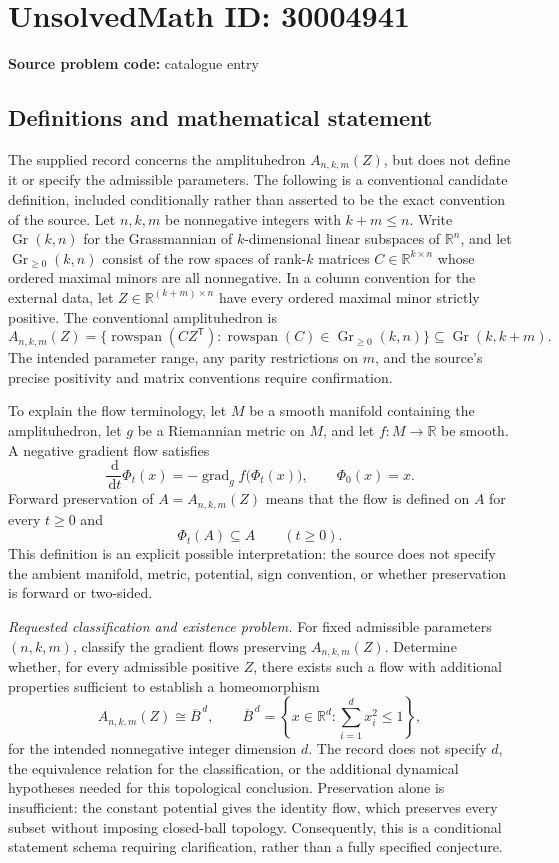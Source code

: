\documentclass[11pt]{article}
\newcommand{\R}{\mathbb{R}}
\newcommand{\dd}{\,\mathrm{d}}
\begin{document}
\section*{UnsolvedMath ID: 30004941}
\textbf{Source problem code:} catalogue entry
\subsection{Definitions and mathematical statement}
The supplied record concerns the amplituhedron \(A_{n,k,m}(Z)\), but does not define it or specify the admissible parameters. The following is a conventional candidate definition, included conditionally rather than asserted to be the exact convention of the source. Let \(n,k,m\) be nonnegative integers with \(k+m\leq n\). Write \(\operatorname{Gr}(k,n)\) for the Grassmannian of \(k\)-dimensional linear subspaces of \(\R^n\), and let \(\operatorname{Gr}_{\geq0}(k,n)\) consist of the row spaces of rank-\(k\) matrices \(C\in\R^{k\times n}\) whose ordered maximal minors are all nonnegative. In a column convention for the external data, let \(Z\in\R^{(k+m)\times n}\) have every ordered maximal minor strictly positive. The conventional amplituhedron is
\[
 A_{n,k,m}(Z)=\bigl\{\operatorname{rowspan}(CZ^{\mathsf T}):\operatorname{rowspan}(C)\in\operatorname{Gr}_{\geq0}(k,n)\bigr\}\subseteq\operatorname{Gr}(k,k+m).
\]
The intended parameter range, any parity restrictions on \(m\), and the source's precise positivity and matrix conventions require confirmation.

To explain the flow terminology, let \(M\) be a smooth manifold containing the amplituhedron, let \(g\) be a Riemannian metric on \(M\), and let \(f:M\to\R\) be smooth. A negative gradient flow satisfies
\[
 \frac{\dd}{\dd t}\Phi_t(x)=-\operatorname{grad}_g f\bigl(\Phi_t(x)\bigr),\qquad \Phi_0(x)=x.
\]
Forward preservation of \(A=A_{n,k,m}(Z)\) means that the flow is defined on \(A\) for every \(t\geq0\) and
\[
 \Phi_t(A)\subseteq A\qquad(t\geq0).
\]
This definition is an explicit possible interpretation: the source does not specify the ambient manifold, metric, potential, sign convention, or whether preservation is forward or two-sided.

\emph{Requested classification and existence problem.} For fixed admissible parameters \((n,k,m)\), classify the gradient flows preserving \(A_{n,k,m}(Z)\). Determine whether, for every admissible positive \(Z\), there exists such a flow with additional properties sufficient to establish a homeomorphism
\[
 A_{n,k,m}(Z)\cong\overline B^{\,d},\qquad
 \overline B^{\,d}=\left\{x\in\R^d:\sum_{i=1}^{d}x_i^2\leq1\right\},
\]
for the intended nonnegative integer dimension \(d\). The record does not specify \(d\), the equivalence relation for the classification, or the additional dynamical hypotheses needed for this topological conclusion. Preservation alone is insufficient: the constant potential gives the identity flow, which preserves every subset without imposing closed-ball topology. Consequently, this is a conditional statement schema requiring clarification, rather than a fully specified conjecture.
\end{document}
